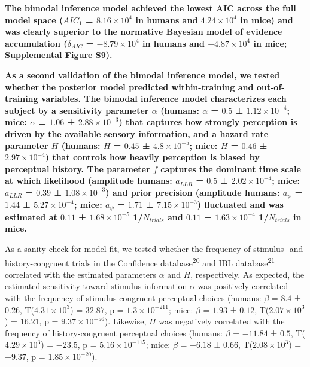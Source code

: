 \documentclass[
]{article}
\begin{document}
\textbf{The bimodal inference model achieved the lowest AIC across the
full model space (\(AIC_1\) = \(\ensuremath{8.16\times 10^{4}}\) in
humans and \(\ensuremath{4.24\times 10^{4}}\) in mice) and was clearly
superior to the normative Bayesian model of evidence accumulation
(\(\delta_{AIC}\) = \(\ensuremath{-8.79\times 10^{4}}\) in humans and
\(\ensuremath{-4.87\times 10^{4}}\) in mice; Supplemental Figure S9).}

\textbf{As a second validation of the bimodal inference model, we tested
whether the posterior model predicted within-training and
out-of-training variables. The bimodal inference model characterizes
each subject by a sensitivity parameter \(\alpha\) (humans: \(\alpha\) =
\(0.5\) ± \(\ensuremath{1.12\times 10^{-4}}\); mice: \(\alpha\) =
\(1.06\) ± \(\ensuremath{2.88\times 10^{-3}}\)) that captures how
strongly perception is driven by the available sensory information, and
a hazard rate parameter \(H\) (humans: \(H\) = \(0.45\) ±
\(\ensuremath{4.8\times 10^{-5}}\); mice: \(H\) = \(0.46\) ±
\(\ensuremath{2.97\times 10^{-4}}\)) that controls how heavily
perception is biased by perceptual history. The parameter \(f\) captures
the dominant time scale at which likelihood (amplitude humans:
\(a_{LLR}\) = \(0.5\) ± \(\ensuremath{2.02\times 10^{-4}}\); mice:
\(a_{LLR}\) = \(0.39\) ± \(\ensuremath{1.08\times 10^{-3}}\)) and prior
precision (amplitude humans: \(a_{\psi}\) = \(1.44\) ±
\(\ensuremath{5.27\times 10^{-4}}\); mice: \(a_{\psi}\) = \(1.71\) ±
\(\ensuremath{7.15\times 10^{-3}}\)) fluctuated and was estimated at
\(0.11\) ± \(\ensuremath{1.68\times 10^{-5}}\) 1/\(N_{trials}\) and
\(0.11\) ± \(\ensuremath{1.63\times 10^{-4}}\) 1/\(N_{trials}\) in
mice.}

As a sanity check for model fit, we tested whether the frequency of
stimulus- and history-congruent trials in the Confidence
database\textsuperscript{20} and IBL database\textsuperscript{21}
correlated with the estimated parameters \(\alpha\) and \(H\),
respectively. As expected, the estimated sensitivity toward stimulus
information \(\alpha\) was positively correlated with the frequency of
stimulus-congruent perceptual choices (humans: \(\beta\) = \(8.4\) ±
\(0.26\), T(\(\ensuremath{4.31\times 10^{3}}\)) = \(32.87\), p =
\(\ensuremath{1.3\times 10^{-211}}\); mice: \(\beta\) = \(1.93\) ±
\(0.12\), T(\(\ensuremath{2.07\times 10^{3}}\)) = \(16.21\), p =
\(\ensuremath{9.37\times 10^{-56}}\)). Likewise, \(H\) was negatively
correlated with the frequency of history-congruent perceptual choices
(humans: \(\beta\) = \(-11.84\) ± \(0.5\),
T(\(\ensuremath{4.29\times 10^{3}}\)) = \(-23.5\), p =
\(\ensuremath{5.16\times 10^{-115}}\); mice: \(\beta\) = \(-6.18\) ±
\(0.66\), T(\(\ensuremath{2.08\times 10^{3}}\)) = \(-9.37\), p =
\(\ensuremath{1.85\times 10^{-20}}\)).
\end{document}
